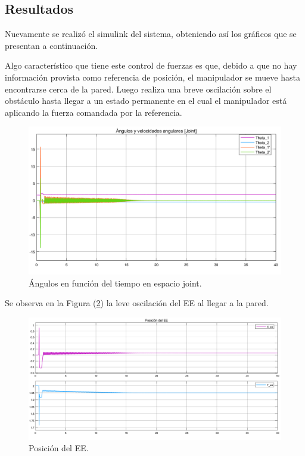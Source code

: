 \subsection{Resultados}
Nuevamente se realizó el simulink del sistema, obteniendo así los gráficos que se presentan a continuación.

Algo característico que tiene este control de fuerzas es que, debido a que no hay información provista como referencia de posición, el manipulador se mueve hasta encontrarse cerca de la pared. Luego realiza una breve oscilación sobre el obstáculo hasta llegar a un estado permanente en el cual el manipulador está aplicando la fuerza comandada por la referencia.

\begin{figure}[H]
	\centering
	\includegraphics[width=0.8\linewidth]{ImagenesControl de fuerza no lineal/2_3_a}
	\caption{\'Angulos en función del tiempo en espacio joint.}	
	\label{fig:athetas_f}
\end{figure}

Se observa en la Figura (\ref{fig:apos_f}) la leve oscilación del EE al llegar a la pared.

\begin{figure}[H]
	\centering
	\includegraphics[width=0.8\linewidth]{ImagenesControl de fuerza no lineal/2_3_b}
	\caption{Posición  del EE.}	
	\label{fig:apos_f}
\end{figure}

